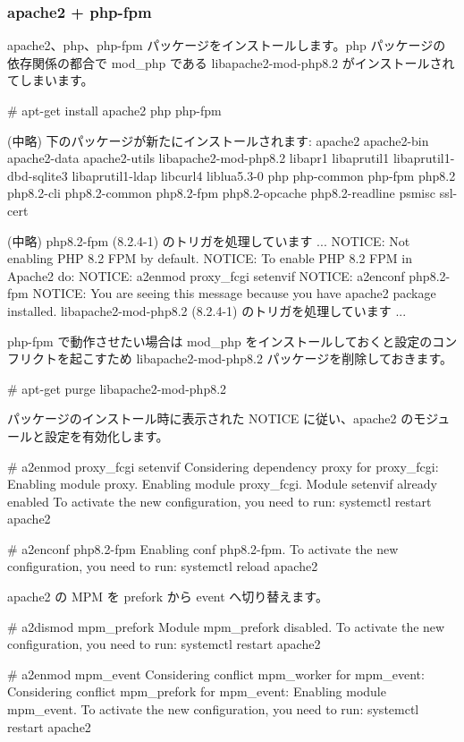 \documentclass[mingoth,a4paper]{jsarticle}
\begin{document}
\subsubsection{apache2 + php-fpm}

apache2、php、php-fpm パッケージをインストールします。php パッケージの依存関係の都合で mod\_php である libapache2-mod-php8.2 がインストールされてしまいます。

\begin{commandline}
# apt-get install apache2 php php-fpm

  (中略)
下のパッケージが新たにインストールされます:
  apache2 apache2-bin apache2-data apache2-utils libapache2-mod-php8.2
  libapr1 libaprutil1 libaprutil1-dbd-sqlite3 libaprutil1-ldap libcurl4
  liblua5.3-0 php php-common php-fpm php8.2 php8.2-cli php8.2-common
  php8.2-fpm php8.2-opcache php8.2-readline psmisc ssl-cert

  (中略)
php8.2-fpm (8.2.4-1) のトリガを処理しています ...
NOTICE: Not enabling PHP 8.2 FPM by default.
NOTICE: To enable PHP 8.2 FPM in Apache2 do:
NOTICE: a2enmod proxy_fcgi setenvif
NOTICE: a2enconf php8.2-fpm
NOTICE: You are seeing this message because you have apache2 package installed.
libapache2-mod-php8.2 (8.2.4-1) のトリガを処理しています ...
\end{commandline}

php-fpm で動作させたい場合は mod\_php をインストールしておくと設定のコンフリクトを起こすため libapache2-mod-php8.2 パッケージを削除しておきます。

\begin{commandline}
# apt-get purge libapache2-mod-php8.2
\end{commandline}

パッケージのインストール時に表示された NOTICE に従い、apache2 のモジュールと設定を有効化します。

\begin{commandline}
# a2enmod proxy_fcgi setenvif
Considering dependency proxy for proxy_fcgi:
Enabling module proxy.
Enabling module proxy_fcgi.
Module setenvif already enabled
To activate the new configuration, you need to run:
  systemctl restart apache2

# a2enconf php8.2-fpm
Enabling conf php8.2-fpm.
To activate the new configuration, you need to run:
  systemctl reload apache2
\end{commandline}

apache2 の MPM を prefork から event へ切り替えます。

\begin{commandline}
# a2dismod mpm_prefork  
Module mpm_prefork disabled.
To activate the new configuration, you need to run:
  systemctl restart apache2

# a2enmod mpm_event
Considering conflict mpm_worker for mpm_event:
Considering conflict mpm_prefork for mpm_event:
Enabling module mpm_event.
To activate the new configuration, you need to run:
  systemctl restart apache2
\end{commandline}
\end{document}
